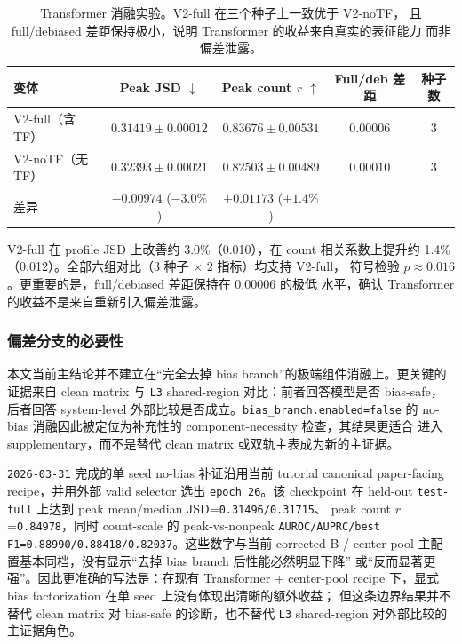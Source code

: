\documentclass[11pt,a4paper]{ctexart}
\begin{document}
\begin{table}[H]
\centering
\caption{Transformer 消融实验。V2-full 在三个种子上一致优于 V2-noTF，
且 full/debiased 差距保持极小，说明 Transformer 的收益来自真实的表征能力
而非偏差泄露。}
\label{tab:tf-ablation}
\begin{tabular}{lcccc}
\toprule
变体 & Peak JSD $\downarrow$ & Peak count $r$ $\uparrow$
  & Full/deb 差距 & 种子数 \\
\midrule
V2-full（含 TF）
  & $\mathbf{0.31419 \pm 0.00012}$ & $\mathbf{0.83676 \pm 0.00531}$
  & $0.00006$ & 3 \\
V2-noTF（无 TF）
  & $0.32393 \pm 0.00021$ & $0.82503 \pm 0.00489$
  & $0.00010$ & 3 \\
\midrule
差异 & $-0.00974$ ($-3.0\%$) & $+0.01173$ ($+1.4\%$) & & \\
\bottomrule
\end{tabular}
\end{table}

V2-full 在 profile JSD 上改善约 3.0\%（0.010），在 count 相关系数上提升约 1.4\%
（0.012）。全部六组对比（3 种子 $\times$ 2 指标）均支持 V2-full，
符号检验 $p \approx 0.016$。更重要的是，full/debiased 差距保持在 0.00006 的极低
水平，确认 Transformer 的收益不是来自重新引入偏差泄露。

\subsubsection{偏差分支的必要性}

本文当前主结论并不建立在“完全去掉 bias branch”的极端组件消融上。更关键的
证据来自 clean matrix 与 \texttt{L3} shared-region 对比：前者回答模型是否
bias-safe，后者回答 system-level 外部比较是否成立。\texttt{bias\_branch.enabled=false}
的 no-bias 消融因此被定位为补充性的 component-necessity 检查，其结果更适合
进入 supplementary，而不是替代 clean matrix 或双轨主表成为新的主证据。

\texttt{2026-03-31} 完成的单 seed no-bias 补证沿用当前 tutorial canonical
paper-facing recipe，并用外部 valid selector 选出 \texttt{epoch 26}。该 checkpoint
在 held-out \texttt{test-full} 上达到 peak mean/median JSD=\texttt{0.31496/0.31715}、
peak count $r$=\texttt{0.84978}，同时 count-scale 的 peak-vs-nonpeak
\texttt{AUROC/AUPRC/best F1=0.88990/0.88418/0.82037}。这些数字与当前 corrected-B /
center-pool 主配置基本同档，没有显示“去掉 bias branch 后性能必然明显下降”
或“反而显著更强”。因此更准确的写法是：在现有 Transformer + center-pool
recipe 下，显式 bias factorization 在单 seed 上没有体现出清晰的额外收益；
但这条边界结果并不替代 clean matrix 对 bias-safe 的诊断，也不替代
\texttt{L3} shared-region 对外部比较的主证据角色。
\end{document}
